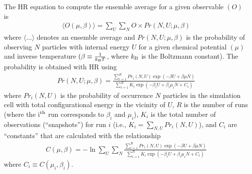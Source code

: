 \documentclass[journal=jced,manuscript=article]{achemso}
\begin{document}
The HR equation to compute the ensemble average for a given observable $(O)$ is 
\begin{eqnarray} \label{eq: HR ave}
\langle O(\mu,\beta) \rangle = \sum_{U} \sum_{N} O \times Pr(N,U;\mu,\beta)
\end{eqnarray}
where $\langle \dots \rangle$ denotes an ensemble average and $Pr(N,U;\mu,\beta)$ is the probability of observing $N$ particles with internal energy $U$ for a given chemical potential $(\mu)$ and inverse temperature $(\beta \equiv \frac{1}{k_{\rm B}T}$, where $k_{\rm B}$ is the Boltzmann constant). The probability is obtained with HR using 
\begin{eqnarray} \label{eq: HR prob}
Pr(N,U;\mu,\beta) = \frac{\sum_{i=1}^{R} Pr_i(N,U)  \exp(-\beta U + \beta \mu N)}{\sum_{i=1}^{R} K_i \exp(-\beta_i U + \beta_i \mu_i N + C_i)}
\end{eqnarray}
where $Pr_i(N,U)$ is the probability of occurrence $N$ particles in the simulation cell with total configurational energy in the vicinity of $U$, $R$ is the number of runs (where the i$^{\rm th}$ run corresponds to $\beta_i$ and $\mu_i$), $K_{i}$ is the total number of observations (``snapshots'') for run $i$ (i.e., $K_{i} = \sum_{N,U} Pr_i(N,U)$), and $C_i$ are ``constants'' that are calculated with the relationship
\begin{eqnarray} \label{eq: Weights}
C(\mu,\beta) = - \ln \sum_{U} \sum_{N} \frac{\sum_{i=1}^{R} Pr_i(N,U) \exp(-\beta U + \beta \mu N)}{\sum_{i=1}^{R} K_i \exp(-\beta_i U + \beta_i \mu_i N + C_i)}
\end{eqnarray}
where $C_i \equiv C(\mu_i,\beta_i)$.
\end{document}
